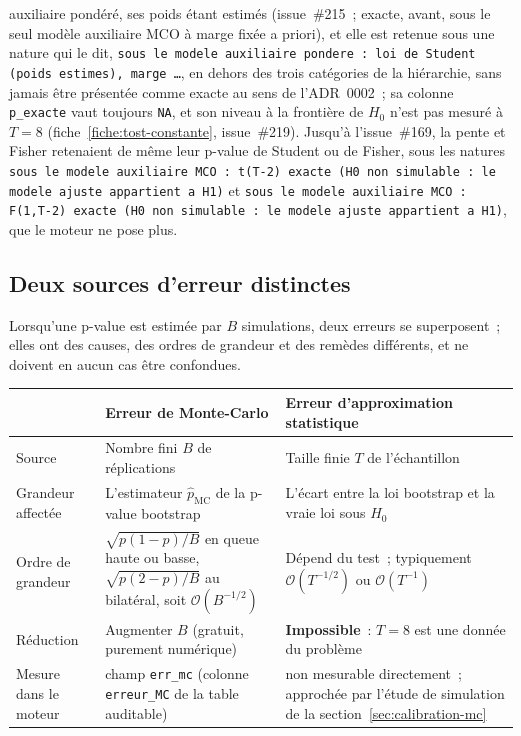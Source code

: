 \documentclass[a4paper,11pt]{article}
\newcommand{\code}[1]{\texttt{\small #1}}
\begin{document}
auxiliaire pondéré, ses poids étant estimés (issue~\#215~; exacte, avant, sous le seul modèle
auxiliaire MCO à marge fixée a priori), et elle est retenue sous une nature qui le dit,
\code{sous le modele auxiliaire pondere : loi de Student (poids estimes), marge \dots}, en dehors
des trois catégories de la hiérarchie, sans jamais être présentée comme exacte au sens de
l'ADR~0002~; sa colonne \code{p\_exacte} vaut toujours \code{NA}, et son niveau à la frontière
de $H_0$ n'est pas mesuré à $T = 8$ (fiche~\ref{fiche:tost-constante}, issue~\#219). Jusqu'à l'issue~\#169, la pente et Fisher retenaient de même
leur p-value de Student ou de Fisher, sous les natures \code{sous le modele auxiliaire MCO~:
t(T-2) exacte (H0 non simulable~: le modele ajuste appartient a H1)} et \code{sous le modele
auxiliaire MCO~: F(1,T-2) exacte (H0 non simulable~: le modele ajuste appartient a H1)}, que le
moteur ne pose plus.

\subsection{Deux sources d'erreur distinctes}
\label{sec:deuxerreurs}

Lorsqu'une p-value est estimée par $B$ simulations, deux erreurs se
superposent~; elles ont des causes, des ordres de grandeur et des remèdes
différents, et ne doivent en aucun cas être confondues.

\begin{center}
\small
\begin{tabular}{@{}p{3.3cm}p{5.8cm}p{5.8cm}@{}}
\toprule
 & \textbf{Erreur de Monte-Carlo} & \textbf{Erreur d'approximation statistique} \\
\midrule
Source & Nombre fini $B$ de réplications & Taille finie $T$ de l'échantillon \\
Grandeur affectée & L'estimateur $\hat p_{\text{MC}}$ de la p-value bootstrap
& L'écart entre la loi bootstrap et la vraie loi sous $H_0$ \\
Ordre de grandeur & $\sqrt{p(1-p)/B}$ en queue haute ou basse,
$\sqrt{p(2-p)/B}$ au bilatéral, soit $\mathcal{O}(B^{-1/2})$ &
Dépend du test~; typiquement $\mathcal{O}(T^{-1/2})$ ou $\mathcal{O}(T^{-1})$ \\
Réduction & Augmenter $B$ (gratuit, purement numérique) &
\textbf{Impossible}~: $T = 8$ est une donnée du problème \\
Mesure dans le moteur & champ \code{err\_mc} (colonne \code{erreur\_MC} de la table
auditable) & non mesurable directement~;
approchée par l'étude de simulation de la section~\ref{sec:calibration-mc} \\
\bottomrule
\end{tabular}
\end{center}
\end{document}
